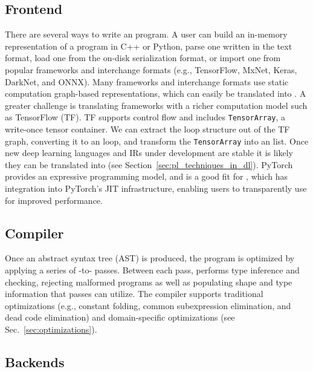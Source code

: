   \subsection*{Frontend}

  There are several ways to write an \relay program.
  A user can build an in-memory representation of
    a program in C++ or Python,
    parse one written in the \relay text format,
    load one from the on-disk serialization format,
    or import one from popular frameworks and interchange formats
      (e.g., TensorFlow, MxNet, Keras, DarkNet, and ONNX).
  Many frameworks and interchange formats use static computation graph-based representations,
    which can easily be translated into \relay.
  A greater challenge is translating frameworks
    with a richer computation model such as TensorFlow (TF).
  TF supports control flow and includes \verb|TensorArray|, a write-once
    tensor container.
  We can extract the loop structure out of the TF graph, converting
    it to an \relay loop, and transform the \verb|TensorArray| into an \relay list.
  Once new deep learning languages and IRs under development
    are stable it is likely they can be translated into \relay (see
    Section~\ref{sec:pl_techniques_in_dl}).
  PyTorch provides an expressive programming model, and is a good fit
    for \relay, which has integration into PyTorch's JIT infrastructure,
    enabling users to transparently use \relay for improved performance.

  \subsection*{Compiler}
  Once an \relay abstract syntax tree (AST) is produced,
    the program is optimized by applying a series of \relay-to-\relay
    passes.
  Between each pass, \relay performs type inference and checking,
    rejecting malformed programs as well as populating shape and type
    information that passes can utilize.
  The \relay compiler supports traditional optimizations
    (e.g., constant folding, common subexpression elimination, and dead code elimination)
    and domain-specific optimizations
    (see Sec.~\ref{sec:optimizations}).

  \subsection*{Backends}

